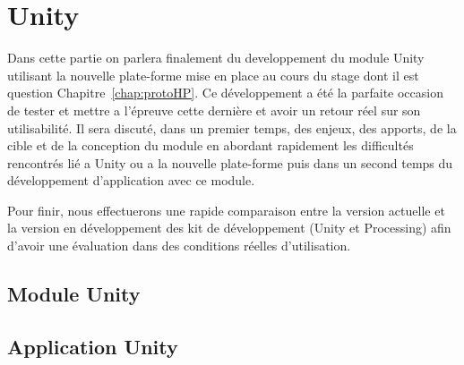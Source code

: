 \chapter{Unity}

Dans cette partie on parlera finalement du developpement du module Unity utilisant la nouvelle plate-forme mise en place au cours du stage dont il est question Chapitre~\ref{chap:protoHP}. Ce développement a été la parfaite occasion de tester et mettre a l'épreuve cette dernière et avoir un retour réel sur son utilisabilité.
Il sera discuté, dans un premier temps, des enjeux, des apports, de la cible et de la conception du module en abordant rapidement les difficultés rencontrés lié a Unity ou a la nouvelle plate-forme puis dans un second temps du développement d'application avec ce module.

Pour finir, nous effectuerons une rapide comparaison entre la version actuelle et la version en développement des kit de développement (Unity et Processing) afin d'avoir une évaluation dans des conditions réelles d'utilisation.

\section{Module Unity}


\section{Application Unity}
